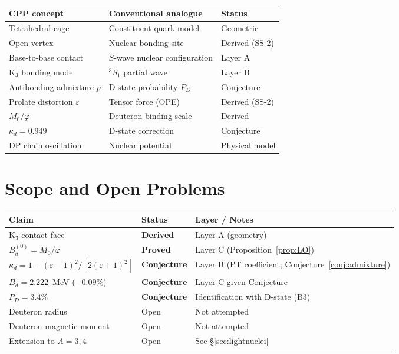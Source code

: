 \documentclass[11pt,letterpaper]{article}
\newcommand{\phig}{\varphi}
\newcommand{\Kthree}{\mathrm{K}_3}
\newcommand{\Mzero}{M_0}
\newcommand{\Bd}{B_d}
\newcommand{\Bdlo}{B_d^{(0)}}
\newcommand{\epscage}{\varepsilon}
\newcommand{\kd}{\kappa_d}
\begin{document}
\begin{center}
\renewcommand{\arraystretch}{1.3}
\begin{tabular}{p{5cm}p{5cm}l}
\toprule
CPP concept & Conventional analogue & Status \\
\midrule
Tetrahedral cage & Constituent quark model & Geometric \\
Open vertex & Nuclear bonding site & Derived (SS-2) \\
Base-to-base contact & $S$-wave nuclear configuration &
Layer A \\
$\Kthree$ bonding mode & $^3S_1$ partial wave & Layer B \\
Antibonding admixture $p$ & D-state probability $P_D$ &
Conjecture \\
Prolate distortion $\epscage$ & Tensor force (OPE) & Derived
(SS-2) \\
$\Mzero/\phig$ & Deuteron binding scale & Derived \\
$\kd = 0.949$ & D-state correction & Conjecture \\
DP chain oscillation & Nuclear potential & Physical model \\
\bottomrule
\end{tabular}
\end{center}

\section{Scope and Open Problems}
\label{sec:scope}

\begin{center}
\renewcommand{\arraystretch}{1.2}
\begin{tabular}{p{5cm}lp{5cm}}
\toprule
Claim & Status & Layer / Notes \\
\midrule
$\Kthree$ contact face & \textbf{Derived} &
Layer A (geometry) \\
$\Bdlo = \Mzero/\phig$ & \textbf{Proved} &
Layer C (Proposition~\ref{prop:LO}) \\
$\kd = 1 - (\epscage-1)^2/[2(\epscage+1)^2]$ &
\textbf{Conjecture} &
Layer B (PT coefficient;
Conjecture~\ref{conj:admixture}) \\
$\Bd = 2.222$~MeV ($-0.09\%$) &
\textbf{Conjecture} &
Layer C given Conjecture \\
$P_D = 3.4\%$ & \textbf{Conjecture} &
Identification with D-state (B3) \\
Deuteron radius & Open & Not attempted \\
Deuteron magnetic moment & Open & Not attempted \\
Extension to $A = 3, 4$ & Open &
See \S\ref{sec:lightnuclei} \\
\bottomrule
\end{tabular}
\end{center}
\end{document}
